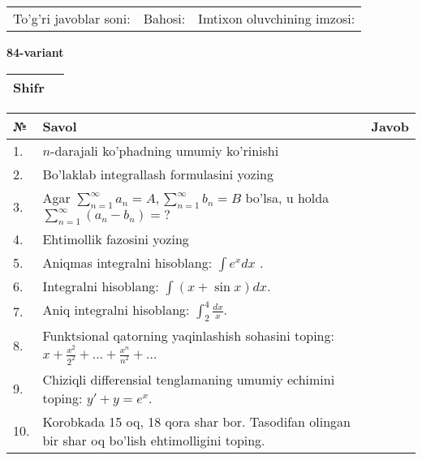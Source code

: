 \documentclass{article}
\begin{document}
  \vspace{1cm}
  
  \begin{tabular}{lll}
  To'g'ri javoblar soni: \underline{\hspace{1.5cm}} & 
  Bahosi: \underline{\hspace{1.5cm}} & 
  Imtixon oluvchining imzosi: \underline{\hspace{2cm}} \\
  \end{tabular}
  
  \egroup
  
  \newpage
  
  
  \textbf{84-variant}\\
  
  \bgroup
  \def\arraystretch{1.6} %
  
  \begin{tabular}{|m{5.7cm}|m{9.5cm}|}
  \hline
  Shifr & \\
  \hline
  \end{tabular}
  
  \vspace{1cm}
  
  \begin{tabular}{|m{0.7cm}|m{10cm}|m{4cm}|}
  \hline
  № & Savol & Javob \\
  \hline
  1. & \(n\)-darajali ko'phadning umumiy ko'rinishi &  \\
  \hline
  2. & Bo'laklab integrallash formulasini yozing &  \\
  \hline
  3. & Agar \(\sum_{n = 1}^{\infty}a_{n} = A,\sum_{n = 1}^{\infty}b_{n} = B\) bo'lsa, u holda \(\sum_{n = 1}^{\infty}\left( a_{n} - b_{n} \right) = ?\) &  \\
  \hline
  4. & Ehtimollik fazosini yozing &  \\
  \hline
  5. & Aniqmas integralni hisoblang: \(\int {e^{x}dx}\) . &  \\
  \hline
  6. & Integralni hisoblang: \(\int {(x + \sin x)dx}\). &  \\
  \hline
  7. & Aniq integralni hisoblang: \(\int_{2}^{4}\frac{dx}{x}\). &  \\
  \hline
  8. & Funktsional qatorning yaqinlashish sohasini toping: \(x + \frac{x^{2}}{2^{2}} + ... + \frac{x^{n}}{n^{2}} + ...\) &  \\
  \hline
  9. & Chiziqli differensial tenglamaning umumiy echimini toping: \(y' + y = e^{x}\). &  \\
  \hline
  10. & Korobkada 15 oq, 18 qora shar bor. Tasodifan olingan bir shar oq bo'lish ehtimolligini toping. &  \\
  \hline
  \end{tabular}
  
\end{document}
